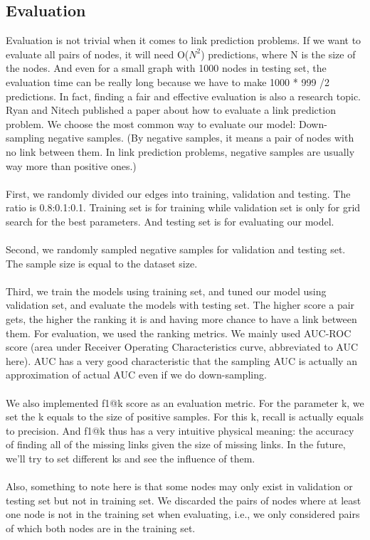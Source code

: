 \documentclass[12pt]{article}
\begin{document}
\subsection{Evaluation}
Evaluation is not trivial when it comes to link prediction problems. If we want to evaluate all pairs of nodes, it will need O($N^2$) predictions, where N is the size of the nodes. And even for a small graph with 1000 nodes in testing set, the evaluation time can be really long because we have to make 1000 * 999 /2 predictions. In fact, finding a fair and effective evaluation is also a research topic. Ryan and Nitech published a paper \cite{eval} about how to evaluate a link prediction problem. We choose the most common way to evaluate our model: Down-sampling negative samples. (By negative samples, it means a pair of nodes with no link between them. In link prediction problems, negative samples are usually way more than positive ones.)
\\
\\
First, we randomly divided our edges into training, validation and testing. The ratio is 0.8:0.1:0.1. Training set is for training while validation set is only for grid search for the best parameters. And testing set is for evaluating our model. 
\\
\\
Second, we randomly sampled negative samples for validation and testing set. The sample size is equal to the dataset size.
\\
\\
Third, we train the models using training set, and tuned our model using validation set, and evaluate the models with testing set. The higher score a pair gets, the higher the ranking it is and having more chance to have a link between them. For evaluation, we used the ranking metrics. We mainly used AUC-ROC score (area under Receiver Operating Characteristics curve, abbreviated to AUC here). AUC has a very good characteristic that the sampling AUC is actually an approximation of actual AUC even if we do down-sampling. 
\\
\\
We also implemented f1@k score as an evaluation metric. For the parameter k, we set the k equals to the size of positive samples. For this k, recall is actually equals to precision. And f1@k thus has a very intuitive physical meaning: the accuracy of finding all of the missing links given the size of missing links. In the future, we'll try to set different ks and see the influence of them. 
\\
\\
Also, something to note here is that some nodes may only exist in validation or testing set but not in training set. We discarded the pairs of nodes where at least one node is not in the training set when evaluating, i.e., we only considered pairs of which both nodes are in the training set.
\end{document}
